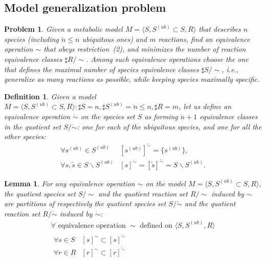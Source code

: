 \documentclass[10pt]{bmc_article}
\newenvironment{bmcformat}{\baselineskip20pt\sloppy\setboolean{publ}{false}}{\baselineskip20pt\sloppy}
\begin{document}
\begin{bmcformat}
\subsection*{Model generalization problem}
\newtheorem{p0}[pbm]{Problem}
\begin{p0}
Given a metabolic model $M=\langle S, S^{(ub)} \subset S, R \rangle$ that describes $n$ species (including $\breve{n} \leq n$ ubiquitous ones) and $m$ reactions, find an equivalence operation $\sim$ that obeys restriction~(2), and minimizes the number of reaction equivalence classes $\sharp R/\sim$. Among such equivalence operations choose the one that defines the maximal number of species equivalence classes $\sharp S/\sim$, i.e., generalize as many reactions as possible, while keeping species maximally specific.
\end{p0}
\newtheorem{eq0}[def]{Definition}\label{equiv0}
\begin{eq0}
Given a model $M=\langle S, S^{(ub)}\subset{S}, R \rangle : \sharp S = n, \sharp S^{(ub)}=\breve{n} \leq n, \sharp R = m$, let us define an \emph{equivalence operation $\mathring{\sim}$} on the species set $S$ as forming $\breve{n} + 1$ equivalence classes in the quotient set $S/\mathring{\sim}$: one for each of the ubiquitous species, and one for all the other species:
\[ \begin{array}{cl}
\mbox{$\forall s^{(ub)} \in S^{(ub)}$} & \mbox{$[s^{(ub)}]^{\mathring{\sim}} = \{s^{(ub)}\}$}, \\
\mbox{$\forall s, \tilde{s} \in S\backslash S^{(ub)}$} & \mbox{$[s]^{\mathring{\sim} } = [\tilde{s}]^{\mathring{\sim} } = S \backslash S^{(ub)}$}. 
\end{array} \]

\end{eq0}
\newtheorem{l1}[lm]{Lemma}
\begin{l1}
For any equivalence operation $\sim$ on the model $M=\langle S, S^{(ub)} \subset S, R \rangle$, the quotient species set $S/\sim$ and the quotient reaction set $R/\sim$ induced by $\sim$ are partitions of respectively the quotient species set $S/\mathring{\sim}$ and the quotient reaction set $R/\mathring{\sim} $ induced by $\mathring{\sim}$:
\[ \begin{array}{c}
\mbox{$\forall $ equivalence operation $\sim$ defined on $\langle S, S^{(ub)}, R \rangle$} \\
\begin{array}{cl}
\mbox{$\forall s \in S$} & \mbox{$[s]^{\sim} \subset [s]^{\mathring{\sim}}$} \\
\mbox{$\forall r \in R$} & \mbox{$[r]^{\sim} \subset [r]^{\mathring{\sim}} $}
\end{array}
\end{array} \]


\end{l1}
\end{bmcformat}
\end{document}
